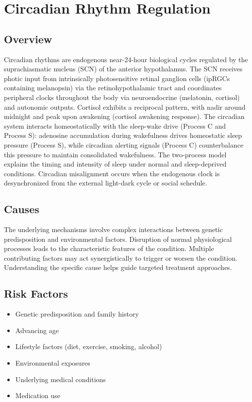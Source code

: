 \chapter{Circadian Rhythm Regulation}
\label{sec:Circadian Rhythm Regulation}

\section{Overview}
Circadian rhythms are endogenous near-24-hour biological cycles regulated by the suprachiasmatic nucleus (SCN) of the anterior hypothalamus. The SCN receives photic input from intrinsically photosensitive retinal ganglion cells (ipRGCs containing melanopsin) via the retinohypothalamic tract and coordinates peripheral clocks throughout the body via neuroendocrine (melatonin, cortisol) and autonomic outputs. Cortisol exhibits a reciprocal pattern, with nadir around midnight and peak upon awakening (cortisol awakening response). The circadian system interacts homeostatically with the sleep-wake drive (Process C and Process S): adenosine accumulation during wakefulness drives homeostatic sleep pressure (Process S), while circadian alerting signals (Process C) counterbalance this pressure to maintain consolidated wakefulness. The two-process model explains the timing and intensity of sleep under normal and sleep-deprived conditions. Circadian misalignment occurs when the endogenous clock is desynchronized from the external light-dark cycle or social schedule.
\section{Causes}
The underlying mechanisms involve complex interactions between genetic predisposition and environmental factors. Disruption of normal physiological processes leads to the characteristic features of the condition. Multiple contributing factors may act synergistically to trigger or worsen the condition. Understanding the specific cause helps guide targeted treatment approaches.
\section{Risk Factors}


\begin{itemize}[noitemsep]
  \item Genetic predisposition and family history
  \item Advancing age
  \item Lifestyle factors (diet, exercise, smoking, alcohol)
  \item Environmental exposures
  \item Underlying medical conditions
  \item Medication use
\end{itemize}
